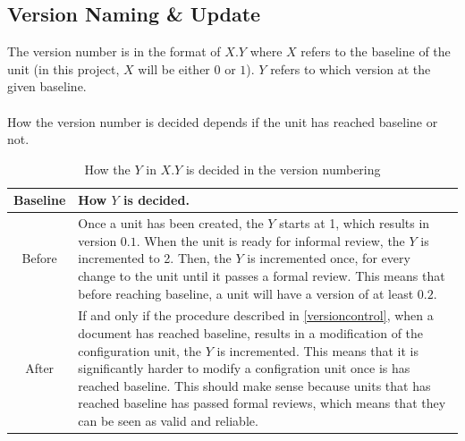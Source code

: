 \documentclass{article}
\begin{document}
    \subsection{Version Naming \& Update}
        The version number is in the format of $X.Y$ where $X$ refers to the baseline
        of the unit (in this project, $X$ will be either $0$ or $1$). $Y$ refers
        to which version at the given baseline.
        \\ \\
        How the version number is decided depends if the unit has reached baseline or not.
        \begin{table}[h]
            \centering
            \begin{tabular}{|c|l|}
                \hline
                    \textbf{Baseline} & \textbf{How $Y$ is decided.} \\
                \hline
                    Before & \parbox{.8\textwidth} { \vspace{.2cm}
                            Once a unit has been created, the $Y$
                            starts at 1, which results in version $0.1$. When the unit is ready for informal
                            review, the $Y$ is incremented to 2. Then, the $Y$ is incremented once, for every change to the unit until it passes a formal review. This means that before reaching baseline, a unit will have a version of at least $0.2$.
                            \vspace{.2cm} } \\
                \hline
                    After & \parbox{.8\textwidth} { \vspace{.2cm}
                        If and only if the procedure described in \ref{versioncontrol}, when a document has reached baseline, results in a modification of the
                        configuration unit, the $Y$ is incremented. This means that
                        it is significantly harder to modify a configration unit once
                        is has reached baseline. This should make sense because units
                        that has reached baseline has passed formal reviews, which means
                        that they can be seen as valid and reliable.
                        \vspace{.2cm}} \\
                \hline
            \end{tabular}
            \caption{How the $Y$ in $X.Y$ is decided in the version numbering}
            \label{versionnumber}
        \end{table}
\end{document}
